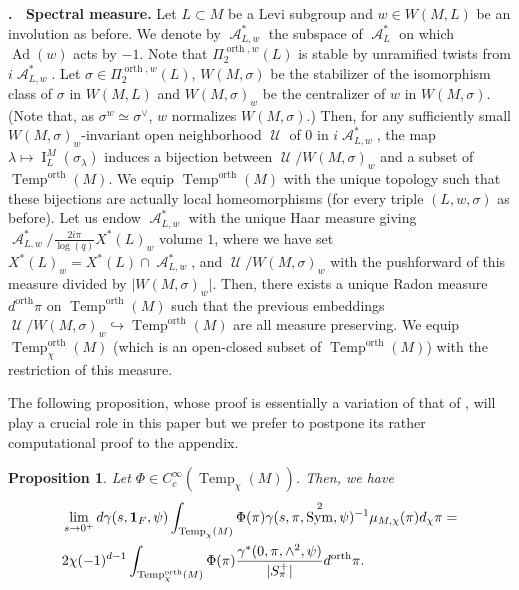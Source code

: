 \documentclass[12pt]{article}
\newenvironment{paragr}[1][]{\refstepcounter{subsubsection} \noindent \textbf{\thesubsubsection . \ #1}}{\medskip}
\newtheorem{prop}{Proposition}[section]
\numberwithin{equation}{section}
\DeclareMathOperator{\orth}{orth}
\DeclareMathOperator{\Temp}{Temp}
\DeclareMathOperator{\Ad}{Ad}
\DeclareMathOperator{\cA}{\mathcal{A}}
\DeclareMathOperator{\cU}{\mathcal{U}}
\DeclareMathOperator{\Sym}{Sym}
\DeclareMathOperator{\rI}{\mathrm{I}}
\begin{document}
\begin{paragr}[Spectral measure.]\label{S orth spectral measure}
Let $L\subset M$ be a Levi subgroup and $w\in W(M,L)$ be an involution as before. We denote by $\cA_{L,w}^*$ the subspace of $\cA_L^*$ on which $\Ad(w)$ acts by $-1$. Note that $\Pi_2^{\orth,w}(L)$ is stable by unramified twists from $i\cA_{L,w}^*$. Let $\sigma\in \Pi_2^{\orth,w}(L)$, $W(M,\sigma)$ be the stabilizer of the isomorphism class of $\sigma$ in $W(M,L)$ and $W(M,\sigma)_w$ be the centralizer of $w$ in $W(M,\sigma)$. (Note that, as $\sigma^w\simeq \sigma^\vee$, $w$ normalizes $W(M,\sigma)$.) Then, for any sufficiently small $W(M,\sigma)_w$-invariant open neighborhood $\cU$ of $0$ in $i\cA_{L,w}^*$, the map $\lambda\mapsto \rI_L^M(\sigma_\lambda)$ induces a bijection between $\cU/W(M,\sigma)_w$ and a subset of $\Temp^{\orth}(M)$. We equip $\Temp^{\orth}(M)$ with the unique topology such that these bijections are actually local homeomorphisms (for every triple $(L,w,\sigma)$ as before). Let us endow $\cA_{L,w}^*$ with the unique Haar measure giving $\cA_{L,w}^*/\frac{2i\pi}{\log(q)}X^*(L)_w$ volume $1$, where we have set $X^*(L)_w=X^*(L)\cap \cA_{L,w}^*$, and $\cU/W(M,\sigma)_w$ with the pushforward of this measure divided by $\lvert W(M,\sigma)_w\rvert$. Then, there exists a unique Radon measure $d^{\orth}\pi$ on $\Temp^{\orth}(M)$ such that the previous embeddings $\cU/W(M,\sigma)_w\hookrightarrow \Temp^{\orth}(M)$ are all measure preserving. We equip $\Temp^{\orth}_\chi(M)$ (which is an open-closed subset of $\Temp^{\orth}(M)$) with the restriction of this measure.

The following proposition, whose proof is essentially a variation of that of \cite[Proposition 3.41]{BPPlanch}, will play a crucial role in this paper but we prefer to postpone its rather computational proof to the appendix.

\begin{prop}\label{prop1 spectral limit}
	Let $\Phi\in C_c^\infty(\Temp_\chi(M))$. Then, we have
	\[\begin{aligned}
		\displaystyle & \lim\limits_{s\to 0^+} d\gamma(s,\mathbf{1}_F,\psi)\int_{\Temp_\chi(M)} \Phi(\pi) \gamma(s,\pi,\Sym^2,\psi)^{-1} \mu_{M,\chi}(\pi)d_\chi\pi= \\
		& 2\chi(-1)^{d-1}\int_{\Temp^{\orth}_\chi(M)} \Phi(\pi) \frac{\gamma^*(0,\pi,\wedge^2,\psi)}{\lvert S_\pi^{+}\rvert} d^{\orth}\pi.
	\end{aligned}\]
\end{prop}


\end{paragr}
\end{document}
